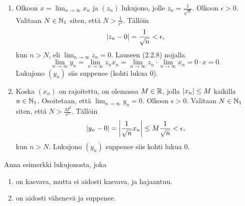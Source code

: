 \documentclass[11pt,a4paper]{amsart}
\begin{document}
\begin{solution}
\leavevmode\par
\begin{enumerate}[label=\alph*), nosep]
\item Olkoon \(x = \lim_{n \to \infty} x_n\) ja \((z_n)\) lukujono, jolle
  \(z_n = \frac{1}{\sqrt{n}}\). Olkoon \(\epsilon > 0\). Valitaan \(N
  \in \NNone\)
  siten, että \(N > \frac{1}{\epsilon^2}\). Tällöin
  \[
    \abs{z_n - 0} = \frac{1}{\sqrt{n}} < \epsilon,
  \]
  kun \(n > N\), eli \(\lim_{n \to \infty} z_n = 0\). Lauseen (2.2.8) nojalla
  \[
    \lim_{n \to \infty} y_n = \lim_{n \to \infty} z_nx_n = \lim_{n
    \to \infty} z_n \cdot \lim_{n \to \infty} x_n = 0\cdot x = 0.
  \]
  Lukujono \((y_n)\) siis suppenee (kohti lukua \(0\)).

\item Koska \((x_n)\) on rajoitettu, on olemassa \(M \in \RR\), jolla
  \(\abs{x_n} \leq M\) kaikilla \(n \in \NNone\). Osoitetaan, että
  \(\lim_{n \to \infty} y_n = 0\). Olkoon \(\epsilon > 0\). Valitaan
  \(N \in \NNone\) siten, että \(N > \frac{M^2}{\epsilon^2}\). Tällöin
  \[
    \abs{y_n - 0} = \abs*{\frac{1}{\sqrt{n}}x_n} \leq
    M\frac{1}{\sqrt{n}} < \epsilon,
  \]
  kun \(n > N\). Lukujono \((y_n)\) suppenee siis kohti lukua \(0\).
\end{enumerate}
\end{solution}

\begin{exercise}
Anna esimerkki lukujonosta, joka
\begin{enumerate}[label=\alph*), nosep]
\item on kasvava, mutta ei aidosti kasvava, ja hajaantuu.
\item on aidosti vähenevä ja suppenee.
\end{enumerate}
\end{exercise}
\end{document}
